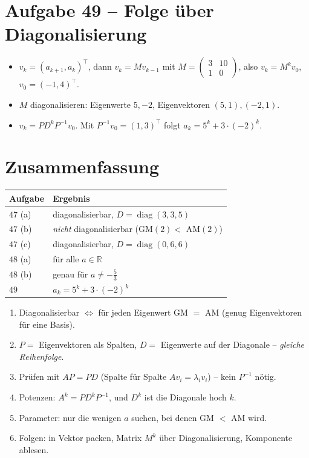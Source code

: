 \documentclass[a4paper,12pt]{article}
\begin{document}
\section*{Aufgabe 49 -- Folge \"uber Diagonalisierung}

\begin{itemize}[leftmargin=*, nosep]
    \item $v_k = (a_{k+1}, a_k)^\top$, dann $v_k = M v_{k-1}$ mit $M = \left(\begin{smallmatrix} 3&10\\1&0 \end{smallmatrix}\right)$, also $v_k = M^k v_0$, $v_0 = (-1,4)^\top$.
    \item $M$ diagonalisieren: Eigenwerte $5, -2$, Eigenvektoren $(5,1), (-2,1)$.
    \item $v_k = P D^k P^{-1} v_0$. Mit $P^{-1} v_0 = (1,3)^\top$ folgt $a_k = 5^k + 3\cdot(-2)^k$.
\end{itemize}

\section*{Zusammenfassung}

\begin{center}
\begin{tabular}{@{}ll@{}}
\toprule
Aufgabe & Ergebnis \\
\midrule
$47$ (a) & diagonalisierbar, $D = \operatorname{diag}(3,3,5)$ \\
$47$ (b) & \emph{nicht} diagonalisierbar (GM$(2) < $ AM$(2)$) \\
$47$ (c) & diagonalisierbar, $D = \operatorname{diag}(0,6,6)$ \\
$48$ (a) & f\"ur alle $a \in \mathbb{R}$ \\
$48$ (b) & genau f\"ur $a \neq -\tfrac{5}{3}$ \\
$49$ & $a_k = 5^k + 3\cdot(-2)^k$ \\
\bottomrule
\end{tabular}
\end{center}

\begin{merkbox}[title={Goldene Regeln}]
\begin{enumerate}[leftmargin=*, nosep]
    \item Diagonalisierbar $\Leftrightarrow$ f\"ur jeden Eigenwert GM $=$ AM (genug Eigenvektoren f\"ur eine Basis).
    \item $P =$ Eigenvektoren als Spalten, $D =$ Eigenwerte auf der Diagonale -- \emph{gleiche Reihenfolge}.
    \item Pr\"ufen mit $AP = PD$ (Spalte f\"ur Spalte $A v_i = \lambda_i v_i$) -- kein $P^{-1}$ n\"otig.
    \item Potenzen: $A^k = P D^k P^{-1}$, und $D^k$ ist die Diagonale hoch $k$.
    \item Parameter: nur die wenigen $a$ suchen, bei denen GM $<$ AM wird.
    \item Folgen: in Vektor packen, Matrix $M^k$ \"uber Diagonalisierung, Komponente ablesen.
\end{enumerate}
\end{merkbox}
\end{document}
